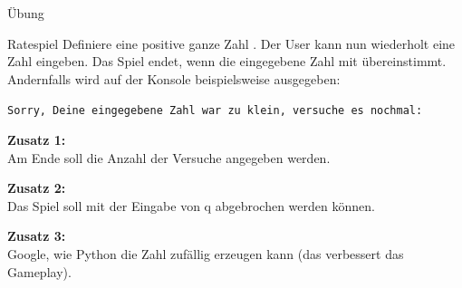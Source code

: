 \begin{frame}{Übung}

\begin{block}{Ratespiel}
\vspace{2pt}
Definiere eine positive ganze Zahl . Der User kann nun wiederholt eine Zahl eingeben. Das Spiel endet, wenn die eingegebene Zahl mit  übereinstimmt. 
Andernfalls wird auf der Konsole beispielsweise ausgegeben: 

\texttt{Sorry, Deine eingegebene Zahl war zu klein, versuche es nochmal: }

\pause
\textbf{Zusatz 1:} \\
Am Ende soll die Anzahl der Versuche angegeben werden.

\pause
\textbf{Zusatz 2:} \\
Das Spiel soll mit der Eingabe von q abgebrochen werden können. 

\pause
\textbf{Zusatz 3:} \\
Google, wie Python die Zahl  zufällig erzeugen kann (das verbessert das Gameplay).  


\end{block}

\end{frame}